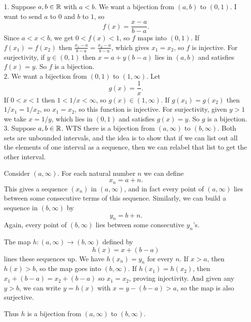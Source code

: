 \documentclass{report}
\begin{document}
\begin{proofWithHibiscus}
  1. Suppose $a,b \in \mathbb{R}$ with $a<b$. We want a bijection from $(a,b)$ to $(0,1)$. 
  I want to send $a$ to $0$ and $b$ to $1$, so 
  \[
    f(x) = \frac{x-a}{b-a}.
  \]
  Since $a<x<b$, we get $0<f(x)<1$, so $f$ maps into $(0,1)$. 
  If $f(x_1)=f(x_2)$ then $\frac{x_1-a}{b-a}=\frac{x_2-a}{b-a}$, which gives $x_1=x_2$, so $f$ is injective. 
  For surjectivity, if $y\in(0,1)$ then $x=a+y(b-a)$ lies in $(a,b)$ and satisfies $f(x)=y$. 
  So $f$ is a bijection. \\

  2. We want a bijection from $(0,1)$ to $(1,\infty)$. 
  Let 
  \[
    g(x) = \frac{1}{x}.
  \]
  If $0<x<1$ then $1<1/x<\infty$, so $g(x)\in(1,\infty)$. 
  If $g(x_1)=g(x_2)$ then $1/x_1=1/x_2$, so $x_1=x_2$, so this function is injective. 
  For surjectivity, given $y>1$ we take $x=1/y$, which lies in $(0,1)$ and satisfies $g(x)=y$. 
  So $g$ is a bijection. \\

  3. Suppose $a,b \in \mathbb{R}$. WTS there is a bijection from $(a,\infty)$ to $(b,\infty)$. 
  Both sets are unbounded intervals, and the idea is to show that if we can list out all the elements of one interval as a sequence, then we can relabel that list to get the other interval. 

  Consider $(a,\infty)$. For each natural number $n$ we can define
  \[
    x_n = a+n.
  \]
  This gives a sequence $(x_n)$ in $(a,\infty)$, and in fact every point of $(a,\infty)$ lies between some consecutive terms of this sequence. Similarly, we can build a sequence in $(b,\infty)$ by
  \[
    y_n = b+n.
  \]
  Again, every point of $(b,\infty)$ lies between some consecutive $y_n$’s. 

  The map $h:(a,\infty)\to(b,\infty)$ defined by
  \[
    h(x) = x+(b-a)
  \]
  lines these sequences up. We have $h(x_n)=y_n$ for every $n$. If $x>a$, then $h(x)>b$, so the map goes into $(b,\infty)$. If $h(x_1)=h(x_2)$, then $x_1+(b-a)=x_2+(b-a)$ so $x_1=x_2$, proving injectivity. And given any $y>b$, we can write $y=h(x)$ with $x=y-(b-a)>a$, so the map is also surjective. 

  Thus $h$ is a bijection from $(a,\infty)$ to $(b,\infty)$.
\end{proofWithHibiscus}
\end{document}
